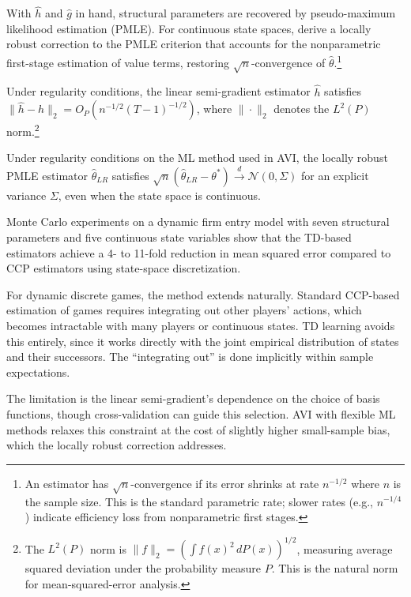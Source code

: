 With $\hat{h}$ and $\hat{g}$ in hand, structural parameters are recovered by pseudo-maximum likelihood estimation (PMLE). For continuous state spaces, \citet{AdusumilliEckardt2022} derive a locally robust correction to the PMLE criterion that accounts for the nonparametric first-stage estimation of value terms, restoring $\sqrt{n}$-convergence of $\hat{\theta}$.\footnote{An estimator has $\sqrt{n}$-convergence if its error shrinks at rate $n^{-1/2}$ where $n$ is the sample size. This is the standard parametric rate; slower rates (e.g., $n^{-1/4}$) indicate efficiency loss from nonparametric first stages.}

\begin{theorem}
Under regularity conditions, the linear semi-gradient estimator $\hat{h}$ satisfies $\|\hat{h} - h\|_2 = O_P(n^{-1/2}(T-1)^{-1/2})$, where $\|\cdot\|_2$ denotes the $L^2(P)$ norm.\footnote{The $L^2(P)$ norm is $\|f\|_2 = (\int f(x)^2 \, dP(x))^{1/2}$, measuring average squared deviation under the probability measure $P$. This is the natural norm for mean-squared-error analysis.}
\end{theorem}

\begin{theorem}
Under regularity conditions on the ML method used in AVI, the locally robust PMLE estimator $\hat{\theta}_{LR}$ satisfies $\sqrt{n}(\hat{\theta}_{LR} - \theta^*) \xrightarrow{d} \mathcal{N}(0, \Sigma)$ for an explicit variance $\Sigma$, even when the state space is continuous.
\end{theorem}

Monte Carlo experiments on a dynamic firm entry model with seven structural parameters and five continuous state variables show that the TD-based estimators achieve a 4- to 11-fold reduction in mean squared error compared to CCP estimators using state-space discretization.

For dynamic discrete games, the method extends naturally. Standard CCP-based estimation of games requires integrating out other players' actions, which becomes intractable with many players or continuous states. TD learning avoids this entirely, since it works directly with the joint empirical distribution of states and their successors. The ``integrating out'' is done implicitly within sample expectations.

The limitation is the linear semi-gradient's dependence on the choice of basis functions, though cross-validation can guide this selection. AVI with flexible ML methods relaxes this constraint at the cost of slightly higher small-sample bias, which the locally robust correction addresses.


